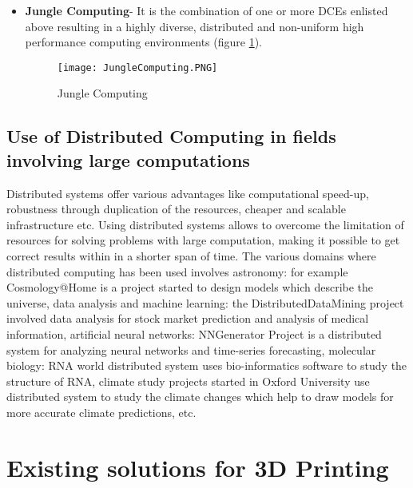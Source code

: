 \begin{itemize}
\item \textbf{Jungle Computing}- It is the combination of one or more DCEs enlisted above resulting in a highly diverse, distributed and non-uniform high performance computing environments (figure \ref{fig:JungleComputing}).  

\begin{figure}[ht!]
\centering
\texttt{[image: JungleComputing.PNG]}
\caption{Jungle Computing}
\label{fig:JungleComputing}
\end{figure}
\end{itemize}

\subsection{Use of Distributed Computing in fields involving large computations}

Distributed systems offer various advantages like computational speed-up, robustness through duplication of the resources, cheaper and scalable infrastructure etc. 
Using distributed systems allows to overcome the limitation of resources for solving problems with large computation, making it possible to get correct results within in a shorter span of time. The various domains where distributed computing has been used involves astronomy: for example Cosmology@Home is a project started to design models which describe the universe, data analysis and machine learning: the DistributedDataMining project involved data analysis for stock market prediction and analysis of medical information, artificial neural networks: NNGenerator Project is a distributed system for analyzing neural networks and time-series forecasting, molecular biology: RNA world distributed system uses bio-informatics software to study the structure of RNA, climate study projects started in Oxford University use distributed system to study the climate changes which help to draw models for more accurate climate predictions, etc.  

\section{Existing solutions for 3D Printing}

